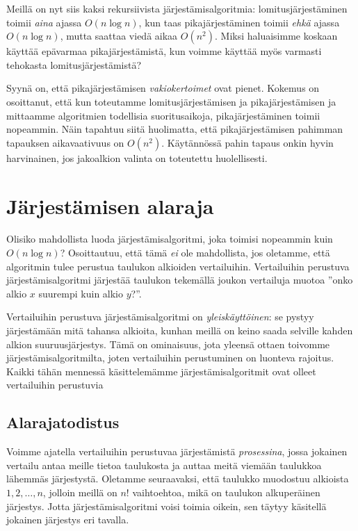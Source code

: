 Meillä on nyt siis kaksi rekursiivista järjestämisalgoritmia:
lomitusjärjestä\-minen toimii \emph{aina} ajassa $O(n \log n)$,
kun taas pikajärjestäminen toimii \emph{ehkä} ajassa $O(n \log n)$,
mutta saattaa viedä aikaa $O(n^2)$.
Miksi haluaisimme koskaan käyttää epävarmaa pikajärjestämistä,
kun voimme käyttää myös varmasti tehokasta lomitusjärjestämistä?

Syynä on, että pikajärjestämisen \emph{vakiokertoimet} ovat pienet.
Kokemus on osoittanut, että kun toteutamme lomitusjärjestämisen ja
pikajärjestämisen ja mittaamme algoritmien todellisia suoritusaikoja,
pikajärjestäminen toimii nopeammin.
Näin tapahtuu siitä huolimatta, että pikajärjestämisen pahimman
tapauksen aikavaativuus on $O(n^2)$.
Käytännössä pahin tapaus onkin hyvin harvinainen,
jos jakoalkion valinta on toteutettu huolellisesti.

\section{Järjestämisen alaraja}

Olisiko mahdollista luoda järjestämisalgoritmi, joka toimisi
nopeammin kuin $O(n \log n)$?
Osoittautuu, että tämä \emph{ei} ole mahdollista,
jos oletamme, että algoritmin tulee perustua taulukon
alkioiden vertailuihin.
Vertailuihin perustuva järjestämisalgoritmi järjestää taulukon
tekemällä joukon vertailuja muotoa
''onko alkio $x$ suurempi kuin alkio $y$?''.

Vertailuihin perustuva järjestämisalgoritmi on \emph{yleiskäyttöinen}:
se pystyy järjestämään mitä tahansa alkioita,
kunhan meillä on keino saada selville kahden alkion suuruusjärjestys.
Tämä on ominaisuus, jota yleensä ottaen toivomme
järjestämisalgoritmilta, joten vertailuihin perustuminen
on luonteva rajoitus.
Kaikki tähän mennessä käsittelemämme järjestämisalgoritmit
ovat olleet vertailuihin perustuvia

\subsection{Alarajatodistus}

Voimme ajatella vertailuihin perustuvaa järjestämistä
\emph{prosessina}, jossa jokainen vertailu antaa meille tietoa
taulukosta ja auttaa meitä viemään taulukkoa lähemmäs järjestystä.
Oletamme seuraavaksi, että taulukko muodostuu alkioista
$1,2,\dots,n$, jolloin meillä on $n!$ vaihtoehtoa, mikä
on taulukon alkuperäinen järjestys.
Jotta järjestämisalgoritmi voisi toimia oikein,
sen täytyy käsitellä jokainen järjestys eri tavalla.

